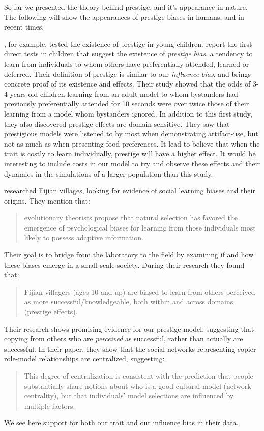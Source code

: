 \documentclass[12pt]{extarticle}
\begin{document}
So far we presented the theory behind prestige, and it's appearance in nature. The following will show the appearances of prestige biases in humans, and in recent times.

\citet{prestige_cultural_learning}, for example, tested the existence of prestige in young children. \citet{prestige_cultural_learning} report the first direct tests in children that suggest the existence of \textit{prestige bias}, a tendency to learn from individuals to whom others have preferentially attended, learned or deferred.
Their definition of prestige is similar to our \textit{influence bias}, and brings concrete proof of its existence and effects. Their study showed that the odds of 3-4 years-old children learning from an adult model to whom bystanders had previously preferentially attended for 10 seconds were over twice those of their learning from a model whom bystanders ignored.
In addition to this first study, they also discovered prestige effects are domain-sensitive. They saw that prestigious models were listened to by most when demonstrating artifact-use, but not as much as when presenting food preferences. It lead \citet{prestige_cultural_learning} to believe that when the trait is costly to learn individually, prestige will have a higher effect. It would be interesting to include costs in our model to try and observe these effects and their dynamics in the simulations of a larger population than this study.

\citet{fijian_social_bias} researched Fijian villages, looking for evidence of social learning biases and their origins. They mention that:
\begin{quote}
evolutionary theorists propose that natural selection has favored the emergence of psychological biases for learning from those individuals most likely to possess adaptive information.
\end{quote}
Their goal is to bridge from the laboratory to the field by examining if and how these biases emerge in a small-scale society.
During their research they found that:
\begin{quote}
Fijian villagers (ages 10 and up) are biased to learn from others perceived as more successful/knowledgeable, both within and across domains (prestige effects).
\end{quote}
Their research shows promising evidence for our prestige model, suggesting that copying from others who are \textit{perceived} as successful, rather than actually are successful. In their paper, they show that the social networks representing copier-role-model relationships are centralized, suggesting:
\begin{quote}
This degree of centralization is consistent with the prediction that people substantially share notions about who is a good cultural model (network centrality), but that individuals’ model selections are influenced by multiple factors.
\end{quote}
We see here support for both our trait and our influence bias in their data.
\end{document}
